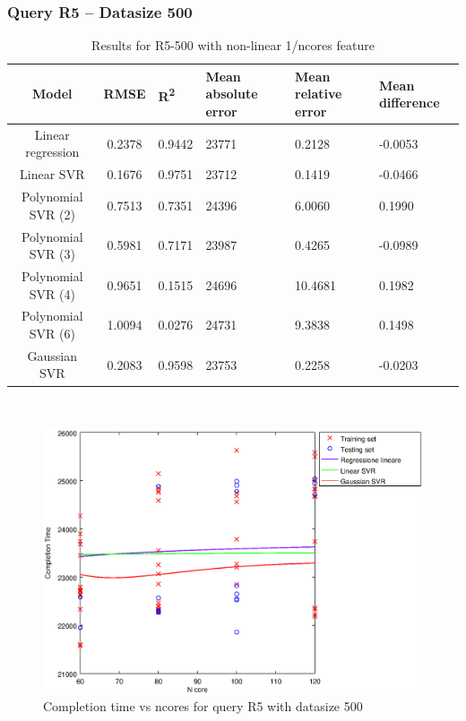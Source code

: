 \documentclass[a4paper,11pt]{article}
\begin{document}
\newpage
\subsubsection{Query R5 -- Datasize 500}
\begin{table}[H]
	\centering
	\begin{adjustbox}{center}
		\begin{tabular}{c | c M{1.2cm} M{2.5cm} M{2.5cm} M{1.8cm}}
			Model & RMSE & R\textsuperscript{2} & Mean absolute error & Mean relative error & Mean difference \tabularnewline
			\hline
			Linear regression & 0.2378 & 0.9442 &  23771 & 0.2128 & -0.0053 \\
			Linear SVR & 0.1676 & 0.9751 &  23712 & 0.1419 & -0.0466 \\
			Polynomial SVR (2) & 0.7513 & 0.7351 &  24396 & 6.0060 & 0.1990 \\
			Polynomial SVR (3) & 0.5981 & 0.7171 &  23987 & 0.4265 & -0.0989 \\
			Polynomial SVR (4) & 0.9651 & 0.1515 &  24696 & 10.4681 & 0.1982 \\
			Polynomial SVR (6) & 1.0094 & 0.0276 &  24731 & 9.3838 & 0.1498 \\
			Gaussian SVR & 0.2083 & 0.9598 &  23753 & 0.2258 & -0.0203 \\
		\end{tabular}
	\end{adjustbox}
	\\
	\caption{Results for R5-500 with non-linear 1/ncores feature}
	\label{table_R5_prediction_all}
\end{table}

\begin {figure}[hbtp]
\centering
\includegraphics[width=\textwidth]{output/R5_500_1_OVER_NCORES/plot_R5_500_bestmodels.eps}
\caption {Completion time vs ncores for query R5 with datasize 500}
\end {figure}
\end{document}
